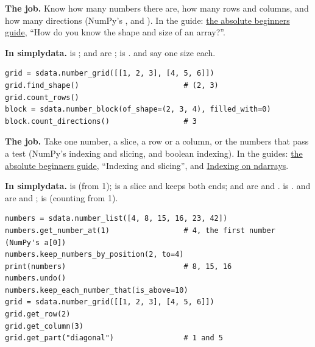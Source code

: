 
\textbf{The job.} Know how many numbers there are, how many rows and columns, and how many directions
(NumPy's ,  and ). In the guide:
\href{https://numpy.org/doc/stable/user/absolute_beginners.html}{the absolute beginners guide}, ``How
do you know the shape and size of an array?''.

\textbf{In simplydata.}  is ;  and
 are ;  is .
 and  say one size each.

\begin{lstlisting}[style=py]
grid = sdata.number_grid([[1, 2, 3], [4, 5, 6]])
grid.find_shape()                        # (2, 3)
grid.count_rows()
block = sdata.number_block(of_shape=(2, 3, 4), filled_with=0)
block.count_directions()                 # 3
\end{lstlisting}


\textbf{The job.} Take one number, a slice, a row or a column, or the numbers that pass a test
(NumPy's indexing and slicing, and boolean indexing). In the guides:
\href{https://numpy.org/doc/stable/user/absolute_beginners.html}{the absolute beginners guide},
``Indexing and slicing'', and \href{https://numpy.org/doc/stable/user/basics.indexing.html}{Indexing
on ndarrays}.

\textbf{In simplydata.}  is  (from 1);  is a slice and keeps both ends;  and  are 
and .  is .
 and  are  and
;  is  (counting from 1).

\begin{lstlisting}[style=py]
numbers = sdata.number_list([4, 8, 15, 16, 23, 42])
numbers.get_number_at(1)                 # 4, the first number (NumPy's a[0])
numbers.keep_numbers_by_position(2, to=4)
print(numbers)                           # 8, 15, 16
numbers.undo()
numbers.keep_each_number_that(is_above=10)
grid = sdata.number_grid([[1, 2, 3], [4, 5, 6]])
grid.get_row(2)
grid.get_column(3)
grid.get_part("diagonal")                # 1 and 5
\end{lstlisting}

